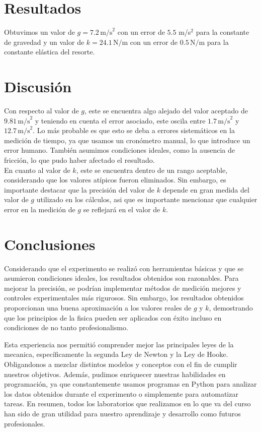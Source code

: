 \documentclass{article}
\begin{document}
\section*{Resultados}
Obtuvimos un valor de $g = 7.2 \, \text{m/s}^2$ con un error de $5.5$ m/s$^2$
para la constante de gravedad y un valor de $k = 24.1 \,
\text{N/m}$ con un error de $0.5 \, \text{N/m}$ para la constante elástica 
del resorte.

\section*{Discusión}
Con respecto al valor de $g$, este se encuentra algo alejado del 
valor aceptado de $9.81 \,\text{m/s}^2$ y teniendo en cuenta el error asociado,
este oscila entre $1.7 \,\text{m/s}^2$ y $12.7 \,\text{m/s}^2$. Lo más probable
es que esto se deba a errores sistemáticos en la medición
de tiempo, ya que usamos un cronómetro manual, lo que introduce un error
humano. También asumimos condiciones ideales, como la ausencia de fricción,
lo que pudo haber afectado el resultado. \\

En cuanto al valor de $k$, este se encuentra dentro de un rango aceptable,
considerando que los valores atípicos fueron eliminados. Sin embargo,
es importante destacar que la precisión del valor de $k$ depende en gran
medida del valor de $g$ utilizado en los cálculos, asi que es importante 
mencionar que cualquier error en la medición de $g$ se reflejará en el valor 
de $k$.
 

\section*{Conclusiones}
Considerando que el experimento se realizó con herramientas básicas y
que se asumieron condiciones ideales, los resultados obtenidos son
razonables. Para mejorar la precisión, se podrían implementar
métodos de medición mejores y controles experimentales más rigurosos.
Sin embargo, los resultados obtenidos proporcionan una buena aproximación
a los valores reales de $g$ y $k$, demostrando que los principios 
de la fisica pueden ser aplicados con éxito incluso en condiciones 
de no tanto profesionalismo.

Esta experiencia nos permitió comprender mejor las principales leyes 
de la mecanica, específicamente la segunda Ley de Newton y la Ley de Hooke.
Obligandonos a mezclar distintos modelos y conceptos con el fin de cumplir
nuestros objetivos.
Además, pudimos enriquecer nuestras habilidades en programación, ya que
constantemente usamos programas en Python para analizar los datos obtenidos
durante el experimento o simplemente para automatizar tareas. En resumen, 
todos los laboratorios que realizamos en lo que va del curso han sido de 
gran utilidad para nuestro aprendizaje y desarrollo como futuros 
profesionales.
\vspace{1.3cm}
\end{document}
